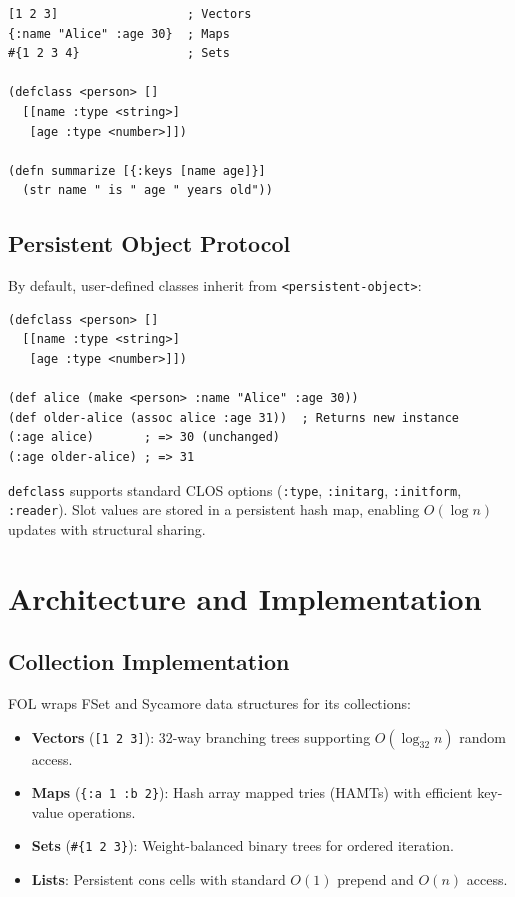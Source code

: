 \documentclass[sigconf,nonacm,review]{acmart}
\begin{document}
\begin{lstlisting}
[1 2 3]                  ; Vectors
{:name "Alice" :age 30}  ; Maps
#{1 2 3 4}               ; Sets

(defclass <person> []
  [[name :type <string>]
   [age :type <number>]])

(defn summarize [{:keys [name age]}]
  (str name " is " age " years old"))
\end{lstlisting}

\subsection{Persistent Object Protocol}

By default, user-defined classes inherit from \texttt{<persistent-object>}:

\begin{lstlisting}
(defclass <person> []
  [[name :type <string>]
   [age :type <number>]])

(def alice (make <person> :name "Alice" :age 30))
(def older-alice (assoc alice :age 31))  ; Returns new instance
(:age alice)       ; => 30 (unchanged)
(:age older-alice) ; => 31
\end{lstlisting}

\texttt{defclass} supports standard CLOS options (\texttt{:type}, \texttt{:initarg}, \texttt{:initform}, \texttt{:reader}). Slot values are stored in a persistent hash map, enabling $O(\log n)$ updates with structural sharing.

\section{Architecture and Implementation}

\subsection{Collection Implementation}

FOL wraps FSet \cite{Burke2007} and Sycamore data structures for its collections:

\begin{itemize}
\item \textbf{Vectors} (\texttt{[1 2 3]}): 32-way branching trees supporting $O(\log_{32} n)$ random access.
\item \textbf{Maps} (\texttt{\{:a 1 :b 2\}}): Hash array mapped tries (HAMTs) with efficient key-value operations.
\item \textbf{Sets} (\texttt{\#\{1 2 3\}}): Weight-balanced binary trees for ordered iteration.
\item \textbf{Lists}: Persistent cons cells with standard $O(1)$ prepend and $O(n)$ access.
\end{itemize}
\end{document}
